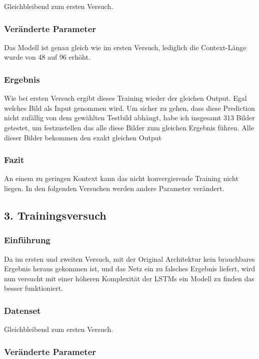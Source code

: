 \documentclass[pdftex,a4paper,halfparskip, article]{scrartcl}
\begin{document}
Gleichbleibend zum ersten Versuch.

\subsubsection*{Veränderte Parameter}

Das Modell ist genau gleich wie im ersten Versuch, lediglich die Context-Länge wurde von 48 auf 96 erhöht.

\subsubsection*{Ergebnis}

Wie bei ersten Versuch ergibt dieses Training wieder der gleichen Output. Egal welches Bild als Input genommen wird. Um sicher zu gehen, dass diese Prediction nicht zufällig von dem gewählten Testbild abhängt, habe ich insgesamt 313 Bilder getestet, um festzustellen das alle diese Bilder zum gleichen Ergebnis führen. Alle dieser Bilder bekommen den exakt gleichen Output

\subsubsection*{Fazit}

An einem zu geringen Kontext kann das nicht konvergierende Training nicht liegen. In den folgenden Versuchen werden andere Parameter verändert.

\subsection{3. Trainingsversuch}


\subsubsection*{Einführung}

Da im ersten und zweiten Versuch, mit der Original Architektur kein brauchbares Ergebnis heraus gekommen ist, und das Netz ein zu falsches Ergebnis liefert, wird nun versucht mit einer höheren Komplexität der LSTMs ein Modell zu finden das besser funktioniert.

\subsubsection*{Datenset}

Gleichbleibend zum ersten Versuch.

\subsubsection*{Veränderte Parameter}
\end{document}
